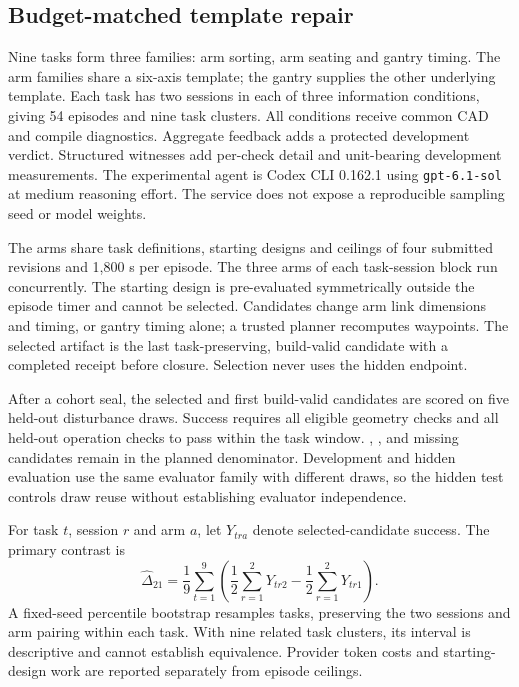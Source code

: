 \subsection{Budget-matched template repair}
Nine tasks form three families: arm sorting, arm seating and gantry timing. The arm families share a six-axis template; the gantry supplies the other underlying template. Each task has two sessions in each of three information conditions, giving 54 episodes and nine task clusters. All conditions receive common CAD and compile diagnostics. Aggregate feedback adds a protected development verdict. Structured witnesses add per-check detail and unit-bearing development measurements. The experimental agent is Codex CLI 0.162.1 using \texttt{gpt-6.1-sol} at medium reasoning effort. The service does not expose a reproducible sampling seed or model weights.

The arms share task definitions, starting designs and ceilings of four submitted revisions and 1,800 s per episode. The three arms of each task-session block run concurrently. The starting design is pre-evaluated symmetrically outside the episode timer and cannot be selected. Candidates change arm link dimensions and timing, or gantry timing alone; a trusted planner recomputes waypoints. The selected artifact is the last task-preserving, build-valid candidate with a completed receipt before closure. Selection never uses the hidden endpoint.

After a cohort seal, the selected and first build-valid candidates are scored on five held-out disturbance draws. Success requires all eligible geometry checks and all held-out operation checks to pass within the task window. , ,  and missing candidates remain in the planned denominator. Development and hidden evaluation use the same evaluator family with different draws, so the hidden test controls draw reuse without establishing evaluator independence.

For task $t$, session $r$ and arm $a$, let $Y_{tra}$ denote selected-candidate success. The primary contrast is
\begin{equation}
 \widehat\Delta_{21}=\frac{1}{9}\sum_{t=1}^{9}
 \left(\frac{1}{2}\sum_{r=1}^{2}Y_{tr2}-\frac{1}{2}\sum_{r=1}^{2}Y_{tr1}\right).
\end{equation}
A fixed-seed percentile bootstrap resamples tasks, preserving the two sessions and arm pairing within each task. With nine related task clusters, its interval is descriptive and cannot establish equivalence. Provider token costs and starting-design work are reported separately from episode ceilings.

